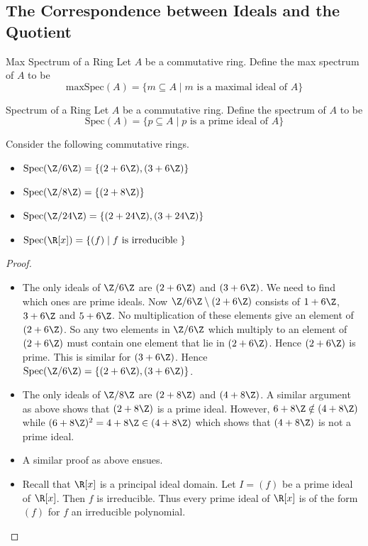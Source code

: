 \documentclass[a4paper]{article}
\begin{document}
\subsection{The Correspondence between Ideals and the Quotient}
\begin{defn}{Max Spectrum of a Ring}{} Let $A$ be a commutative ring. Define the max spectrum of $A$ to be $$\text{maxSpec}(A)=\{m\subseteq A\;|\;m\text{ is a maximal ideal of }A\}$$
\end{defn}

\begin{defn}{Spectrum of a Ring}{} Let $A$ be a commutative ring. Define the spectrum of $A$ to be $$\text{Spec}(A)=\{p\subseteq A\;|\;p\text{ is a prime ideal of }A\}$$
\end{defn}

\begin{eg}{}{} Consider the following commutative rings. 
\begin{itemize}
\item $\text{Spec}(\Z/6\Z)=\{(2+6\Z),(3+6\Z)\}$
\item $\text{Spec}(\Z/8\Z)=\{(2+8\Z)\}$
\item $\text{Spec}(\Z/24\Z)=\{(2+24\Z),(3+24\Z)\}$
\item $\text{Spec}(\R[x])=\{(f)\;|\;f\text{ is irreducible }\}$
\end{itemize} 
\begin{proof}\\
\begin{itemize}
\item The only ideals of $\Z/6\Z$ are $(2+6\Z)$ and $(3+6\Z)$. We need to find which ones are prime ideals. Now $\Z/6\Z\setminus(2+6\Z)$ consists of $1+6\Z$, $3+6\Z$ and $5+6\Z$. No multiplication of these elements give an element of $(2+6\Z)$. So any two elements in $\Z/6\Z$ which multiply to an element of $(2+6\Z)$ must contain one element that lie in $(2+6\Z)$. Hence $(2+6\Z)$ is prime. This is similar for $(3+6\Z)$. Hence $\text{Spec}(\Z/6\Z)=\{(2+6\Z),(3+6\Z)\}$. 
\item The only ideals of $\Z/8\Z$ are $(2+8\Z)$ and $(4+8\Z)$. A similar argument as above shows that $(2+8\Z)$ is a prime ideal. However, $6+8\Z\notin(4+8\Z)$ while $(6+8\Z)^2=4+8\Z\in(4+8\Z)$ which shows that $(4+8\Z)$ is not a prime ideal. 
\item A similar proof as above ensues. 
\item Recall that $\R[x]$ is a principal ideal domain. Let $I=(f)$ be a prime ideal of $\R[x]$. Then $f$ is irreducible. Thus every prime ideal of $\R[x]$ is of the form $(f)$ for $f$ an irreducible polynomial. 
\end{itemize}
\end{proof}
\end{eg}
\end{document}
